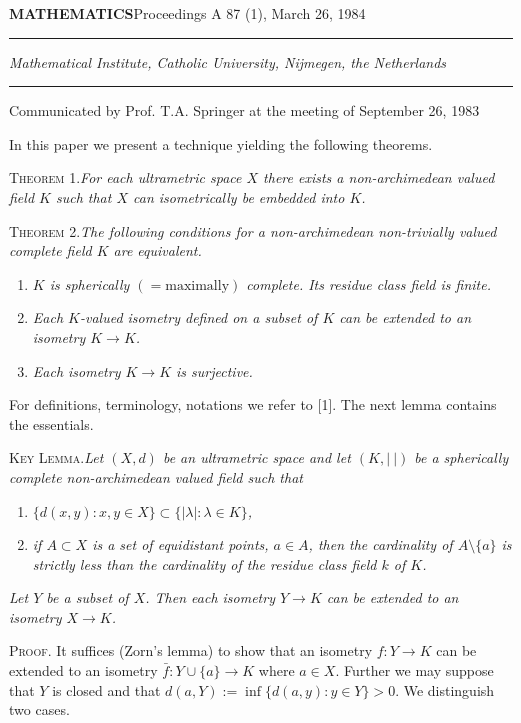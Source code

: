 \documentclass[11pt,a4paper,twoside]{article}
\newcommand{\thm}[2]{\par\medskip\noindent\textsc{Theorem #1.}\quad\textit{#2}\par}
\newcommand{\proofhead}[1]{\par\medskip\noindent\textsc{#1}\quad}
\begin{document}
\setcounter{page}{51}
\noindent\textbf{MATHEMATICS}\hfill Proceedings A 87 (1), March 26, 1984
\par\smallskip\hrule\bigskip
{}
\vspace{1.5cm}
\par{}
\bigskip
\par\noindent\textit{Mathematical Institute, Catholic University, Nijmegen, the Netherlands}
\vspace{1.3cm}
\par\hrule\medskip
\noindent Communicated by Prof. T.A. Springer at the meeting of September 26, 1983
\vspace{1.5cm}

In this paper we present a technique yielding the following theorems.

\thm{1}{For each ultrametric space $X$ there exists a non-archi\-medean valued field $K$ such that $X$ can isometrically be embedded into $K$.}

\thm{2}{The following conditions for a non-archi\-medean non-trivially valued complete field $K$ are equivalent.}
\begin{enumerate}[label={($\alph*$)},leftmargin=2em,itemsep=1pt]
\renewcommand{\labelenumi}{($\alpha$)}
\item \textit{$K$ is spherically $(=\text{maximally})$ complete. Its residue class field is finite.}
\renewcommand{\labelenumi}{($\beta$)}
\item \textit{Each $K$-valued isometry defined on a subset of $K$ can be extended to an isometry $K\to K$.}
\renewcommand{\labelenumi}{($\gamma$)}
\item \textit{Each isometry $K\to K$ is surjective.}
\end{enumerate}

For definitions, terminology, notations we refer to [1]. The next lemma contains the essentials.

\medskip\noindent\textsc{Key Lemma.}\quad\textit{Let $(X,d)$ be an ultrametric space and let $(K,|\ |)$ be a spherically complete non-archi\-medean valued field such that}
\begin{enumerate}[label=(\roman*),leftmargin=2em,itemsep=1pt]
\item \textit{$\{d(x,y):x,y\in X\}\subset\{|\lambda|:\lambda\in K\}$,}
\item \textit{if $A\subset X$ is a set of equidistant points, $a\in A$, then the cardinality of $A\setminus\{a\}$ is strictly less than the cardinality of the residue class field $k$ of $K$.}
\end{enumerate}
\noindent\textit{Let $Y$ be a subset of $X$. Then each isometry $Y\to K$ can be extended to an isometry $X\to K$.}
\newpage
\proofhead{Proof.} It suffices (Zorn's lemma) to show that an isometry $f\colon Y\to K$ can be extended to an isometry $\bar f\colon Y\cup\{a\}\to K$ where $a\in X$. Further we may suppose that $Y$ is closed and that $d(a,Y):=\inf\{d(a,y):y\in Y\}>0$. We distinguish two cases.
\end{document}
